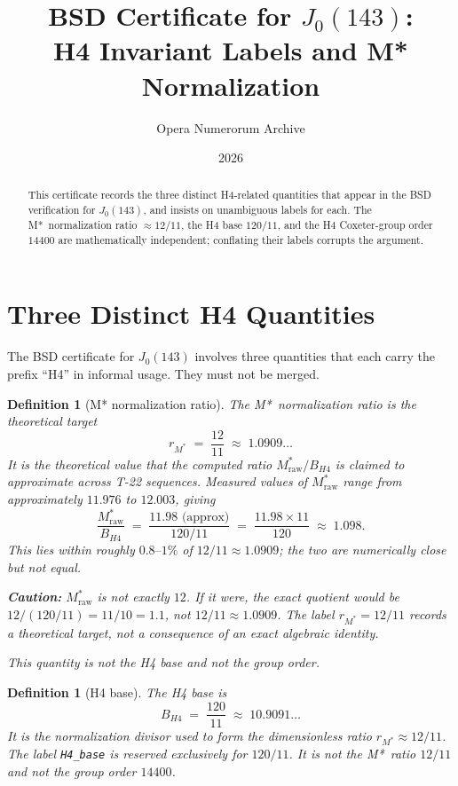 \documentclass[12pt]{article}
\title{BSD Certificate for $J_0(143)$:\\
  H4 Invariant Labels and M* Normalization}
\author{Opera Numerorum Archive}
\date{2026}
\newtheorem{definition}[theorem]{Definition}
\begin{document}
\maketitle

\begin{abstract}
This certificate records the three distinct H4-related quantities
that appear in the BSD verification for $J_0(143)$, and insists on
unambiguous labels for each.  The M*~normalization ratio $\approx 12/11$,
the H4 base $120/11$, and the H4 Coxeter-group order $14400$ are
mathematically independent; conflating their labels corrupts the
argument.
\end{abstract}

\section{Three Distinct H4 Quantities}

The BSD certificate for $J_0(143)$ involves three quantities that
each carry the prefix ``H4'' in informal usage.  They must not be
merged.

\begin{definition}[M* normalization ratio]\label{def:mstar-ratio}
The \emph{M*~normalization ratio} is the theoretical target
\[
  r_{M^*} \;=\; \frac{12}{11} \;\approx\; 1.0909\ldots
\]
It is the theoretical value that the computed ratio
$M^*_{\mathrm{raw}}/B_{H4}$ is claimed to approximate across T-22
sequences.  Measured values of $M^*_{\mathrm{raw}}$ range from
approximately $11.976$ to $12.003$, giving
\[
  \frac{M^*_{\mathrm{raw}}}{B_{H4}}
  \;=\;
  \frac{11.98\text{ (approx)}}{120/11}
  \;=\;
  \frac{11.98 \times 11}{120}
  \;\approx\; 1.098.
\]
This lies within roughly $0.8\text{--}1\%$ of $12/11\approx 1.0909$;
the two are numerically close but not equal.

\textbf{Caution:} $M^*_{\mathrm{raw}}$ is \emph{not} exactly $12$.
If it were, the exact quotient would be $12/(120/11)=11/10=1.1$, not
$12/11\approx 1.0909$.  The label $r_{M^*}=12/11$ records a
theoretical target, not a consequence of an exact algebraic identity.

This quantity is \emph{not} the H4 base and \emph{not} the group order.
\end{definition}

\begin{definition}[H4 base]\label{def:h4-base}
The \emph{H4 base} is
\[
  B_{H4} \;=\; \frac{120}{11} \;\approx\; 10.9091\ldots
\]
It is the normalization divisor used to form the dimensionless ratio
$r_{M^*} \approx 12/11$.  The label \texttt{H4\_base} is reserved
exclusively for $120/11$.  It is \emph{not} the M*~ratio $12/11$ and
\emph{not} the group order $14400$.
\end{definition}
\end{document}
